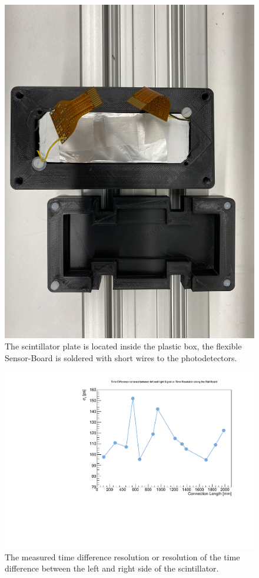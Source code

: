 \documentclass[../BTOF_summary.tex]{subfiles}
\begin{document}
\begin{figure}[h!]
    \centering
    \includegraphics[scale=0.2]{Pictures/Box_SciTile1.pdf}
    \caption{The scintillator plate is located inside the plastic box, the flexible Sensor-Board is soldered with short wires to the photodetectors.}
    \label{fig:Box_SciTile1}
\end{figure}

\begin{figure}[h!]
    \centering
    \includegraphics[scale=0.5]{Pictures/TimeRes.pdf}
    \caption{The measured time difference resolution or resolution of the time difference between the left and right side of the scintillator.}
    \label{fig:TR}
\end{figure}
\end{document}
